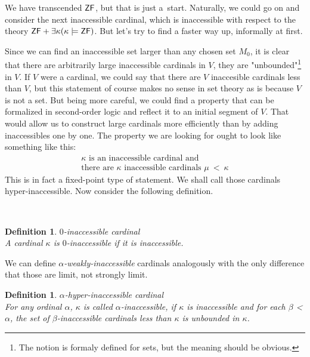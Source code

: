 \documentclass[12pt,a4paper]{article}
\newtheorem{definition}[theorem]{Definition}
\begin{document}


We have transcended $\sf{ZF}$, but that is just a~start. Naturally, we could go on and consider the next inaccessible cardinal, which is inaccessible with respect to the theory $\sf{ZF} + \exists \kappa (\kappa \models \sf{ZF})$. But let's try to find a faster way up, informally at first. 

Since we can find an inaccessible set larger than any chosen set $M_0$, it is clear that there are arbitrarily large inaccessible cardinals in $V$, they are "unbounded"\footnote{The notion is formaly defined for sets, but the meaning should be obvious.} in $V$. If $V$ were a cardinal, we could say that there are $V$ inaccesible cardinals less than $V$, but this statement of course makes no sense in set theory as is because $V$ is not a set. But being more careful, we could find a property that can be formalized in second-order logic and reflect it to an initial segment of $V$. That would allow us to construct large cardinals more efficiently than by adding inaccessibles one by one. The property we are looking for ought to look like something like this:
\begin{equation}
\begin{split}
\kappa \mbox{ is an inaccessible cardinal and}\\
\mbox{there are }\kappa\mbox{ inaccessible cardinals }\mu\ <\ \kappa
\end{split}
\end{equation}
This is in fact a fixed-point type of statement. We shall call those cardinals hyper-inaccessible. Now consider the following definition.

\

\begin{definition}{$0$-inaccessible cardinal}\\
A cardinal $\kappa$ is $0$-inaccessible if it is inaccessible.
\end{definition}
We can define \emph{$\alpha$-weakly-inaccessible} cardinals analogously with the only difference that those are limit, not strongly limit.
\

\begin{definition}{$\alpha$-hyper-inaccessible cardinal}\label{def:alpha_inaccessible}\\
For any ordinal $\alpha$, $\kappa$ is called $\alpha$-inaccessible, if $\kappa$ is inaccessible and for each $\beta$ < $\alpha$, the set of $\beta$-inaccessible cardinals less than $\kappa$ is unbounded in $\kappa$.
\end{definition}
\end{document}
